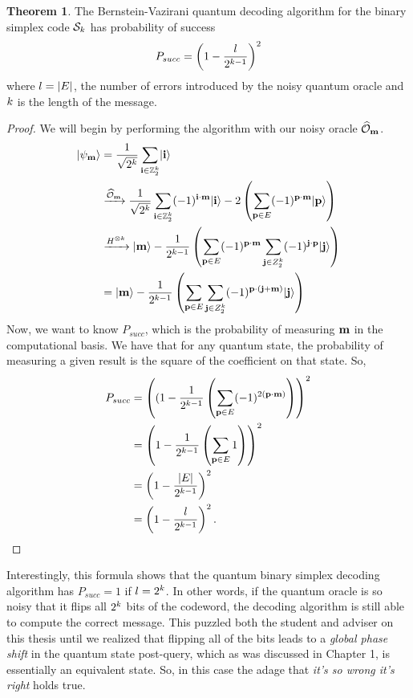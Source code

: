 \documentclass[12pt,twoside]{reedthesis}
\theoremstyle{definition}
\newtheorem{theorem}{Theorem}[chapter]
\newlength{\arrow}
\newcommand{\Z}{\mathbb{Z}}
\newcommand{\ket}[1]{\ensuremath{\lvert #1\rangle}\xspace}
\begin{document}
\begin{theorem} \label{cool_thm} The Bernstein-Vazirani quantum decoding algorithm for the binary simplex code $\mathcal{S}_k$ has probability of success
\begin{equation*}
P_{succ} = \left(1 - \frac{l}{2^{k-1}}\right)^2
\end{equation*}
where $l= \lvert E \rvert$, the number of errors introduced by the noisy quantum oracle and $k$ is the length of the message.
\end{theorem}

\begin{proof}
We will begin by performing the algorithm with our noisy oracle $\widehat{\mathcal{O}}_\mathbf{m}$.
\begin{align*}
\ket{\psi_\mess} 
& = \frac{1}{\sqrt{2^\mlen}} \sum_{\mathbf{i} \in \Z_2^\mlen} \ket{\mathbf{i}} \\
& \xrightarrow{\widehat{\mathcal{O}}_\mess} \frac{1}{\sqrt{2^\mlen}} \sum_{\mathbf{i} \in \Z_2^\mlen} (-1)^{\mathbf{i} \cdot \mess}\ket{\mathbf{i}} -2\left( \sum_{\mathbf{p} \in E} (-1)^{\mathbf{p} \cdot \mess} \ket{\mathbf{p}}\right) \\
& \xrightarrow{H^{\otimes \mlen}} \ket{\mess} - \frac{1}{2^{\mlen -1}} \left( \sum_{\mathbf{p} \in E}(-1)^{\mathbf{p} \cdot \mess} \sum_{\mathbf{j} \in Z_2^\mlen} (-1)^{\mathbf{j} \cdot \mathbf{p}} \ket{\mathbf{j}}\right)\\
& = \ket{\mess} - \frac{1}{2^{\mlen-1}} \left( \sum_{\mathbf{p} \in E}\sum_{\mathbf{j} \in Z_2^\mlen} (-1)^{\mathbf{p} \cdot(\mathbf{j}+\mess)} \ket{\mathbf{j}} \right)
\end{align*}
Now, we want to know $P_{succ}$, which is the probability of measuring $\mathbf{m}$ in the computational basis. We have that for any quantum state, the probability of measuring a given result is the square of the coefficient on that state. So,
\begin{align*}
P_{succ} 
& = \left((1 - \frac{1}{2^{k-1}} \left( \sum_{\mathbf{p} \in E} (-1)^{2(\mathbf{p} \cdot \mathbf{m})} \right)\right)^2 \\
& = \left(1 - \frac{1}{2^{k-1}} \left( \sum_{\mathbf{p} \in E} 1 \right) \right)^2 \\
& = \left( 1 - \frac{\lvert E \rvert}{2^{k-1}}\right)^2\\
& = \left( 1 - \frac{l}{2^{k-1}}\right)^2.
\end{align*}
\end{proof}
Interestingly, this formula shows that the quantum binary simplex decoding algorithm has $P_{succ} = 1$ if $l = 2^k$. In other words, if the quantum oracle is so noisy that it flips all $2^k$ bits of the codeword, the decoding algorithm is still able to compute the correct message. This puzzled both the student and adviser on this thesis until we realized that flipping all of the bits leads to a \textit{global phase shift} in the quantum state post-query, which as was discussed in Chapter 1, is essentially an equivalent state. So, in this case the adage that \textit{it's so wrong it's right} holds true.
\end{document}
